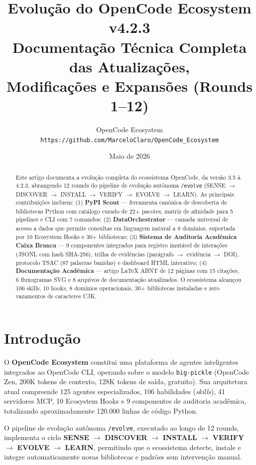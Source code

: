 \documentclass[12pt,a4paper]{article}
\title{\textbf{Evolução do OpenCode Ecosystem v4.2.3}\\[4pt]
       \large Documentação Técnica Completa das Atualizações,\\
       Modificações e Expansões (Rounds 1--12)}
\author{OpenCode Ecosystem\\
        \texttt{https://github.com/MarceloClaro/OpenCode\_Ecosystem}}
\date{Maio de 2026}
\begin{document}
\maketitle

\begin{abstract}
\noindent Este artigo documenta a evolução completa do ecossistema OpenCode, da versão 3.5 à 4.2.3, abrangendo 12 rounds do pipeline de evolução autônoma \texttt{/evolve} (SENSE $\rightarrow$ DISCOVER $\rightarrow$ INSTALL $\rightarrow$ VERIFY $\rightarrow$ EVOLVE $\rightarrow$ LEARN). As principais contribuições incluem: (1) \textbf{PyPI Scout} --- ferramenta canônica de descoberta de bibliotecas Python com catálogo curado de 22+ pacotes, matriz de afinidade para 5 pipelines e CLI com 7 comandos; (2) \textbf{DataOrchestrator} --- camada universal de acesso a dados que permite consultas em linguagem natural a 8 domínios, suportada por 10 Ecosystem Hooks e 30+ bibliotecas; (3) \textbf{Sistema de Auditoria Acadêmica Caixa Branca} --- 9 componentes integrados para registro imutável de interações (JSONL com hash SHA-256), trilha de evidências (parágrafo $\rightarrow$ evidência $\rightarrow$ DOI), protocolo TSAC (87 palavras banidas) e dashboard HTML interativo; (4) \textbf{Documentação Acadêmica} --- artigo LaTeX ABNT de 12 páginas com 15 citações, 6 fluxogramas SVG e 8 arquivos de documentação atualizados. O ecossistema alcançou 106 skills, 10 hooks, 8 domínios operacionais, 30+ bibliotecas instaladas e zero vazamentos de caracteres CJK.
\end{abstract}

\section{Introdução}

O \textbf{OpenCode Ecosystem} constitui uma plataforma de agentes inteligentes integrados ao OpenCode CLI, operando sobre o modelo \texttt{big-pickle} (OpenCode Zen, 200K tokens de contexto, 128K tokens de saída, gratuito). Sua arquitetura atual compreende 125 agentes especializados, 106 habilidades (\textit{skills}), 41 servidores MCP, 10 Ecosystem Hooks e 9 componentes de auditoria acadêmica, totalizando aproximadamente 120.000 linhas de código Python.

O pipeline de evolução autônoma \texttt{/evolve}, executado ao longo de 12 rounds, implementa o ciclo \textbf{SENSE} $\rightarrow$ \textbf{DISCOVER} $\rightarrow$ \textbf{INSTALL} $\rightarrow$ \textbf{VERIFY} $\rightarrow$ \textbf{EVOLVE} $\rightarrow$ \textbf{LEARN}, permitindo que o ecossistema detecte, instale e integre automaticamente novas bibliotecas e padrões sem intervenção manual.
\end{document}
